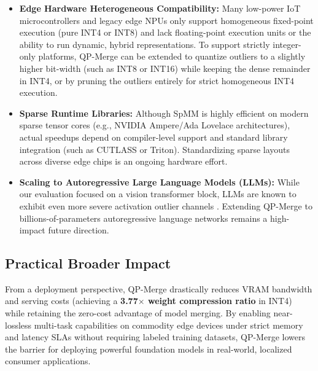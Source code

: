 \begin{itemize}
\begin{enumerate}
    \end{enumerate}
    \item \textbf{Edge Hardware Heterogeneous Compatibility:} Many low-power IoT microcontrollers and legacy edge NPUs only support homogeneous fixed-point execution (pure INT4 or INT8) and lack floating-point execution units or the ability to run dynamic, hybrid representations. To support strictly integer-only platforms, QP-Merge can be extended to quantize outliers to a slightly higher bit-width (such as INT8 or INT16) while keeping the dense remainder in INT4, or by pruning the outliers entirely for strict homogeneous INT4 execution.
    \item \textbf{Sparse Runtime Libraries:} Although SpMM is highly efficient on modern sparse tensor cores (e.g., NVIDIA Ampere/Ada Lovelace architectures), actual speedups depend on compiler-level support and standard library integration (such as CUTLASS or Triton). Standardizing sparse layouts across diverse edge chips is an ongoing hardware effort.
    \item \textbf{Scaling to Autoregressive Large Language Models (LLMs):} While our evaluation focused on a vision transformer block, LLMs are known to exhibit even more severe activation outlier channels \cite{dettmers2022gpt3}. Extending QP-Merge to billions-of-parameters autoregressive language networks remains a high-impact future direction.
\end{itemize}

\subsection{Practical Broader Impact}
From a deployment perspective, QP-Merge drastically reduces VRAM bandwidth and serving costs (achieving a \textbf{3.77$\times$ weight compression ratio} in INT4) while retaining the zero-cost advantage of model merging. By enabling near-lossless multi-task capabilities on commodity edge devices under strict memory and latency SLAs without requiring labeled training datasets, QP-Merge lowers the barrier for deploying powerful foundation models in real-world, localized consumer applications.
